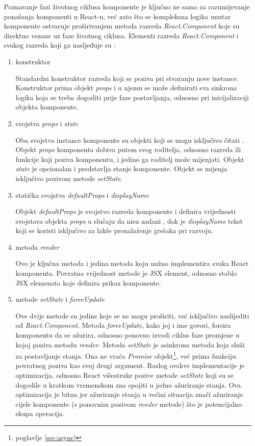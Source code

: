 \documentclass[times, utf8, diplomski, numeric]{fer}
\begin{document}
\noindent Poznavanje fazi životnog ciklusa komponente je ključno ne samo za razumijevanje ponašanja komponenti u React-u, već zato što se kompleksna logika unutar komponente ostvaruje proširivanjem metoda razreda \emph{React.Component} koje su direktno vezane uz faze životnog ciklusa.
Elementi razreda \emph{React.Component} i svakog razreda koji ga nasljeđuje su \citep{react_docs}:

\begin{enumerate}[label=(\alph*)]

    \item konstruktor
    
    Standardni konstruktor razreda koji se poziva pri stvaranju nove instance. Konstruktor prima objekt \emph{props} i u njemu se može definirati sva sinkrona logika koja se treba dogoditi prije faze postavljanja, odnosno pri inicijalizaciji objekta komponente.

    \item svojstva \emph{props} i \emph{state}
    
    Oba svojstva instance komponente su objekti koji se mogu isključivo čitati .
    Objekt \emph{props} komponenta dobiva putem svog roditelja, odnosno razreda ili funkcije koji poziva komponentu, i jedino ga roditelj može mijenjati.
    Objekt \emph{state} je opcionalan i predstavlja stanje komponente. Objekt se mijenja isključivo pozivom metode \emph{setState}.

    \item statička svojstva \emph{defaultProps} i \emph{displayName}
    
    Objekt \emph{defaultProps} je svojstvo razreda komponente i definira vrijednosti svojstava objekta \emph{props} u slučaju da nisu zadani , dok je \emph{displayName} tekst koji se koristi isključivo za lakše pronalaženje grešaka pri razvoju.

    \item metoda \emph{render}
    
    Ovo je ključna metoda i jedina metoda koju nužno implementira svaka React komponenta. Povratna vrijednost metode je JSX element, odnosno stablo JSX elemenata koje definira prikaz komponente.

    \item metode \emph{setState} i \emph{forceUpdate}
    
    Ove dvije metode su jedine koje se ne mogu proširiti, već isključivo naslijediti od \emph{React.Component}.
    Metoda \emph{forceUpdate}, kako joj i ime govori, forsira komponentu da se ažurira, odnosno ponovno izvodi ciklus faze promjene u kojoj poziva metodu \emph{render}.
    Metoda \emph{setState} je asinkrona metoda koja služi za postavljanje stanja.
    Ona ne vraća \emph{Promise} objekt\footnote{poglavlje \ref{sec:async}}, već prima funkciju povratnog poziva kao svoj drugi argument.
    Razlog ovakve implementacije je optimizacija, odnosno React višestruke pozive metode \emph{setState} koji su se dogodile u kratkom vremenskom zna spojiti u jedno ažuriranje stanja.
    Ova optimizacija je bitna jer ažuriranje stanja u većini situacija znači ažuriranje cijele komponente (s ponovnim pozivom \emph{render} metode) što je potencijalno skupa operacija.


\end{enumerate}
\end{document}
